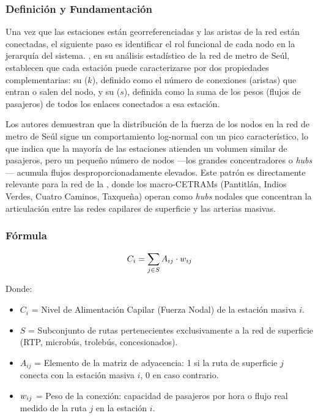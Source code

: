 \subsubsection{Definición y Fundamentación}

Una vez que las estaciones están georreferenciadas y las aristas de la red están
conectadas, el siguiente paso es identificar el rol funcional de cada nodo en la
jerarquía del sistema. \textcite{lee2008}, en su análisis estadístico de la red de
metro de Seúl, establecen que cada estación puede caracterizarse por dos
propiedades complementarias: su  ($k$), definido como el número de
conexiones (aristas) que entran o salen del nodo, y su  ($s$),
definida como la suma de los pesos (flujos de pasajeros) de todos los enlaces
conectados a esa estación.

Los autores demuestran que la distribución de la fuerza de los nodos en la red de
metro de Seúl sigue un comportamiento log-normal con un pico característico, lo que
indica que la mayoría de las estaciones atienden un volumen similar de pasajeros,
pero un pequeño número de nodos ---los grandes concentradores o
\textit{hubs}--- acumula flujos desproporcionadamente elevados. Este patrón es
directamente relevante para la red de la \cdmx{}, donde los macro-CETRAMs
(Pantitlán, Indios Verdes, Cuatro Caminos, Taxqueña) operan como \textit{hubs}
nodales que concentran la articulación entre las redes capilares de superficie y las
arterias masivas.

\subsubsection{Fórmula}

\begin{equation}
    C_i = \sum_{j \in S} A_{ij} \cdot w_{ij}
    \label{eq:fuerza-nodal}
\end{equation}

Donde:
\begin{itemize}
    \item $C_i$ = Nivel de Alimentación Capilar (Fuerza Nodal) de la estación
    masiva $i$.
    \item $S$ = Subconjunto de rutas pertenecientes exclusivamente a la red de
    superficie (RTP, microbús, trolebús, concesionados).
    \item $A_{ij}$ = Elemento de la matriz de adyacencia: 1 si la ruta de superficie
    $j$ conecta con la estación masiva $i$, 0 en caso contrario.
    \item $w_{ij}$ = Peso de la conexión: capacidad de pasajeros por hora o flujo
    real medido de la ruta $j$ en la estación $i$.
\end{itemize}

